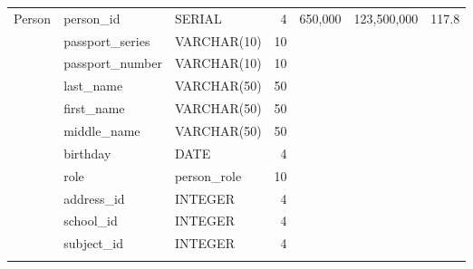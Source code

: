 \documentclass[a4paper]{article}
\begin{document}
{\begin{longtable}{l p{2cm} p{2cm} r r r r}
            \multirow{11}{*}{Person}
                              & person\_id           & SERIAL               & 4                     & \multirow{11}{*}{650,000}  & \multirow{11}{*}{123,500,000} & \multirow{11}{*}{117.8}  \\
                              & passport\_series     & VARCHAR(10)          & 10                    &                            &                               &                          \\
                              & passport\_number     & VARCHAR(10)          & 10                    &                            &                               &                          \\
                              & last\_name           & VARCHAR(50)          & 50                    &                            &                               &                          \\
                              & first\_name          & VARCHAR(50)          & 50                    &                            &                               &                          \\
                              & middle\_name         & VARCHAR(50)          & 50                    &                            &                               &                          \\
                              & birthday             & DATE                 & 4                     &                            &                               &                          \\
                              & role                 & person\_role         & 10                    &                            &                               &                          \\
                              & address\_id          & INTEGER              & 4                     &                            &                               &                          \\
                              & school\_id           & INTEGER              & 4                     &                            &                               &                          \\
                              & subject\_id          & INTEGER              & 4                     &                            &                               &                          \\ \addlinespace
            \hline


\end{longtable}}
\end{document}
